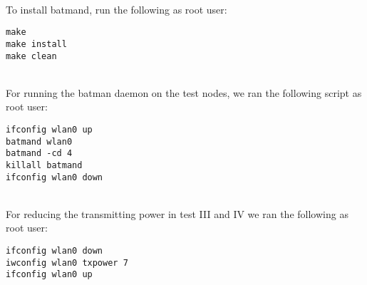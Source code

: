 \noindent
\\
To install batmand, run the following as root user:

\begin{lstlisting}[frame=tb]
make
make install
make clean
\end{lstlisting}

\noindent
\\
For running the batman daemon on the test nodes, we ran the following script as root user:

\begin{lstlisting}[frame=tb]
ifconfig wlan0 up
batmand wlan0
batmand -cd 4
killall batmand
ifconfig wlan0 down
\end{lstlisting}

\noindent
\\
For reducing the transmitting power in test III and IV we ran the following as root user:

\begin{lstlisting}[frame=tb]
ifconfig wlan0 down
iwconfig wlan0 txpower 7
ifconfig wlan0 up
\end{lstlisting}


